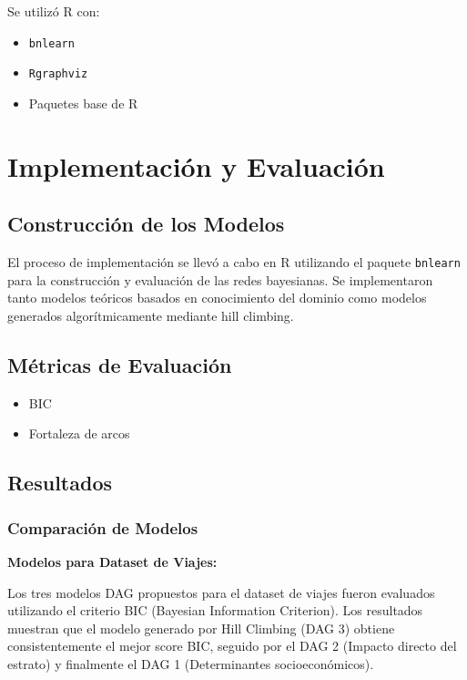 \documentclass[12pt,a4paper]{article}
\begin{document}
Se utilizó R con:
\begin{itemize}
    \item \texttt{bnlearn}
    \item \texttt{Rgraphviz}
    \item Paquetes base de R
\end{itemize}

\section{Implementación y Evaluación}

\subsection{Construcción de los Modelos}

El proceso de implementación se llevó a cabo en R utilizando el paquete \texttt{bnlearn} para la construcción y evaluación de las redes bayesianas. Se implementaron tanto modelos teóricos basados en conocimiento del dominio como modelos generados algorítmicamente mediante hill climbing.

\subsection{Métricas de Evaluación}

\begin{itemize}
    \item BIC
    \item Fortaleza de arcos
\end{itemize}

\subsection{Resultados}

\subsubsection{Comparación de Modelos}

\textbf{Modelos para Dataset de Viajes:}

Los tres modelos DAG propuestos para el dataset de viajes fueron evaluados utilizando el criterio BIC (Bayesian Information Criterion). Los resultados muestran que el modelo generado por Hill Climbing (DAG 3) obtiene consistentemente el mejor score BIC, seguido por el DAG 2 (Impacto directo del estrato) y finalmente el DAG 1 (Determinantes socioeconómicos).
\end{document}
